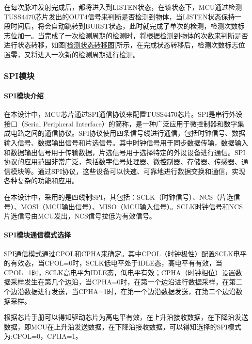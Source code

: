 在每次脉冲发射完成后，都将进入到LISTEN状态，在该状态下，MCU通过检测TUSS4470芯片发出的OUT4信号来判断是否检测到物体，当LISTEN状态保持一段时间后，将会自动跳转到BURST状态，此时就完成了单次的检测，检测次数标志位加一。当完成了一次检测周期的检测时，将根据检测到物体的次数来判断是否进行状态转移，如图\ref{检测状态转移图}所示，在完成状态转移后，检测次数标志位置零，又将进入一次新的检测周期进行检测。

\subsubsection{SPI模块}
\noindent
\paragraph{SPI模块介绍}
在本设计中，MCU芯片通过SPI通信协议来配置TUSS4470芯片。SPI是串行外设接口（Serial Peripheral Interface）的简称，是一种广泛应用于微控制器和数字集成电路之间的通信协议。SPI协议使用四条信号线进行通信，包括时钟信号、数据输入信号、数据输出信号和片选信号。其中时钟信号用于同步数据传输，数据输入和数据输出信号用于传输数据，片选信号用于选择特定的外设设备进行通信。SPI协议的应用范围非常广泛，包括数字信号处理器、微控制器、存储器、传感器、通信模块等。通过SPI协议，这些设备可以快速、可靠地进行数据交换和通信，实现各种复杂的功能和应用。

在本设计中，采用的是四线制SPI，其包括：SCLK（时钟信号）、NCS（片选信号）、MOSI（MCU输出信号）、MISO（MCU输入信号）。SCLK时钟信号和NCS片选信号由MCU发出，NCS信号拉低为有效信号。
\noindent
\paragraph{SPI模块通信模式选择}
SPI通信模式通过CPOL和CPHA来确定。其中CPOL（时钟极性）配置SCLK电平的有效态，当CPOL=0时，SCLK低电平处于IDLE态，高电平有有效，当CPOL=1时，SCLK高电平为IDLE态，低电平有效；CPHA（时钟相位）设置数据采样发生在第几个边沿，当CPHA=0时，在第一个边沿进行数据采样，在第二个边沿数据进行发送，当CPHA=1时，在第一个边沿数据发送，在第二个边沿数据采样。\par
根据芯片手册可以得知驱动芯片为高电平有效，在上升沿接收数据，在下降沿发送数据，即MCU在上升沿发送数据，在下降沿接收数据，可以得知选择的SPI模式为:CPOL=0，CPHA=1。
\noindent
